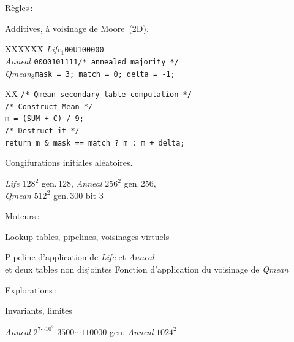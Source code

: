\documentclass[a4paper,dvips]{slides}
\renewcommand{\arule}[1]{\emph{\mbox{#1}}} %
\renewcommand{\asquare}[1]{\ensuremath{#1^{2}}}
\newcommand{\agen}[1]{gen.\,#1}
\newcommand{\aplane}[1]{bit #1}
\newcommand{\mytitle}[1]{\begin{center}\begin{large}#1\end{large}\end{center}}
\newcommand{\mystitle}[1]{\begin{center}#1\end{center}}
\begin{document}
\begin{slide}
  \mytitle{R\`egles\,:}
  Additives, \`a voisinage de Moore~(2D).
  \begin{tabbing}
    XXXXXX\=\kill
    \arule{Life$_1$}\>\texttt{00U100000}\\
    \arule{Anneal$_1$}\>\texttt{0000101111\scriptsize /* annealed majority */}\\
    \arule{Qmean$_8$}\>\texttt{mask = 3; match = 0; delta = -1;}\\
  \end{tabbing}
  \begin{scriptsize}
    \vspace{-\bigskipamount}
    \begin{tabbing}
      XX\=\kill
      \>\texttt{/* Qmean secondary table computation */}\\
      \>\texttt{/* Construct Mean */}\\
      \>\texttt{m = (SUM + C) / 9;}\\
      \>\texttt{/* Destruct it */}\\
      \>\texttt{return~m~\&~mask~==~match~?~m~:~m~+~delta;}
    \end{tabbing}
  \end{scriptsize}
  Congifurations initiales al\'eatoires.
  {\begin{scriptsize}
    \arule{Life} \asquare{128} \agen{128},
    \arule{Anneal} \asquare{256} \agen{256},\\
    \arule{Qmean} \asquare{512} \agen{300} \aplane{3}
    \end{scriptsize}}
\end{slide}

\begin{slide}
  \mytitle{Moteurs\,:}
  \mystitle{Lookup-tables, pipelines, voisinages virtuels}
  {Pipeline d'application de \arule{Life} et \arule{Anneal}\\
    et deux tables non disjointes}
  {Fonction d'application du voisinage de \arule{Qmean}}
\end{slide}

\begin{slide}
  \mytitle{Explorations\,:}
  \mystitle{Invariants, limites}
  {\arule{Anneal} $2^{{7\cdots10}^2}$ $3500\cdots110000$ gen.}
  {\arule{Anneal} \asquare{1024}}
\end{slide}
\end{document}
